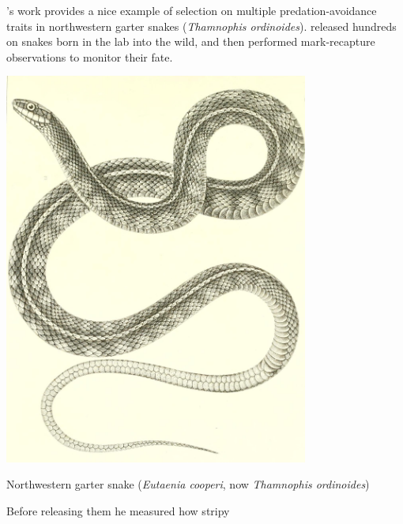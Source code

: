 \citet{brodie1992correlational}'s work provides a nice example of
selection on multiple predation-avoidance traits in northwestern garter snakes
({\it Thamnophis ordinoides}). \citeauthor{brodie1992correlational} released hundreds on snakes born in
the lab into the wild, and then performed mark-recapture observations
to monitor their fate.
\begin{marginfigure}
\begin{center} 
\includegraphics[width= 0.75\textwidth]{illustration_images/Quant_gen/Garter_snake/Eutaenia_cooperi.jpg}
\end{center}
\caption{Northwestern garter snake ({\it Eutaenia cooperi}, now {\it
    Thamnophis ordinoides})
 } \label{fig:Garter_snake}
\end{marginfigure}  Before releasing them he measured how stripy
